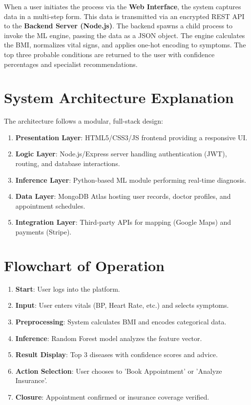 \documentclass[12pt,a4paper]{article}
\begin{document}
When a user initiates the process via the \textbf{Web Interface}, the system captures data in a multi-step form. This data is transmitted via an encrypted REST API to the \textbf{Backend Server (Node.js)}. The backend spawns a child process to invoke the ML engine, passing the data as a JSON object. The engine calculates the BMI, normalizes vital signs, and applies one-hot encoding to symptoms. The top three probable conditions are returned to the user with confidence percentages and specialist recommendations.

\section{System Architecture Explanation}
The architecture follows a modular, full-stack design:
\begin{enumerate}
    \item \textbf{Presentation Layer}: HTML5/CSS3/JS frontend providing a responsive UI.
    \item \textbf{Logic Layer}: Node.js/Express server handling authentication (JWT), routing, and database interactions.
    \item \textbf{Inference Layer}: Python-based ML module performing real-time diagnosis.
    \item \textbf{Data Layer}: MongoDB Atlas hosting user records, doctor profiles, and appointment schedules.
    \item \textbf{Integration Layer}: Third-party APIs for mapping (Google Maps) and payments (Stripe).
\end{enumerate}

\section{Flowchart of Operation}
\begin{enumerate}
    \item \textbf{Start}: User logs into the platform.
    \item \textbf{Input}: User enters vitals (BP, Heart Rate, etc.) and selects symptoms.
    \item \textbf{Preprocessing}: System calculates BMI and encodes categorical data.
    \item \textbf{Inference}: Random Forest model analyzes the feature vector.
    \item \textbf{Result Display}: Top 3 diseases with confidence scores and advice.
    \item \textbf{Action Selection}: User chooses to 'Book Appointment' or 'Analyze Insurance'.
    \item \textbf{Closure}: Appointment confirmed or insurance coverage verified.
\end{enumerate}
\end{document}
